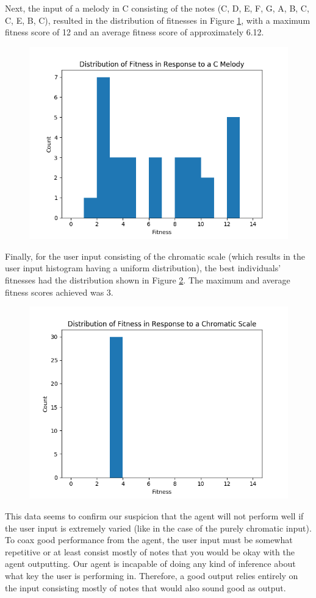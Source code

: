 \documentclass[conference]{IEEEtran}
\begin{document}
Next, the input of a melody in C consisting of the notes (C, D, E, F, G, A, B, C, C, E, B, C), resulted in the distribution of fitnesses in Figure \ref{fig:cmelodydist}, with a maximum fitness score of 12 and an average fitness score of  approximately 6.12. 


\begin{figure}[H]
	\centering
	\includegraphics[width=0.7\linewidth]{cMelodyDist}
	\caption{}
	\label{fig:cmelodydist}
\end{figure}

Finally, for the user input consisting of the chromatic scale (which results in the user input histogram having a uniform distribution), the best individuals’ fitnesses had the distribution shown in Figure \ref{fig:chromaticdist}. The maximum and average fitness scores achieved was 3.


\begin{figure}[H]
	\centering
	\includegraphics[width=0.7\linewidth]{chromaticDist}
	\caption{}
	\label{fig:chromaticdist}
\end{figure}

This data seems to confirm our suspicion that the agent will not perform well if the user input is extremely varied (like in the case of the purely chromatic input). To coax good performance from the agent, the user input must be somewhat repetitive or at least consist mostly of notes that you would be okay with the agent outputting. Our agent is incapable of doing any kind of inference about what key the user is performing in. Therefore, a good output relies entirely on the input consisting mostly of notes that would also sound good as output.
\end{document}
